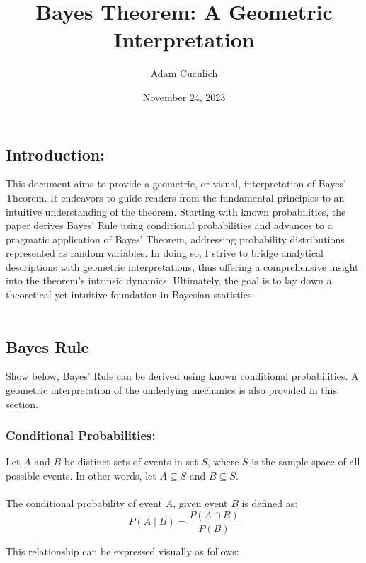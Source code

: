 \documentclass[12pt]{article}
\title{Bayes Theorem: A Geometric Interpretation}
\author{Adam Cuculich}
\date{November 24, 2023}
\begin{document}
\maketitle %

\subsection*{Introduction:}
This document aims to provide a geometric, or visual, interpretation of Bayes’ Theorem. It endeavors to guide readers from the fundamental principles to an intuitive understanding of the theorem. Starting with known probabilities, the paper derives Bayes’ Rule using conditional probabilities and advances to a pragmatic application of Bayes’ Theorem, addressing probability distributions represented as random variables. In doing so, I strive to bridge analytical descriptions with geometric interpretations, thus offering a comprehensive insight into the theorem’s intrinsic dynamics. Ultimately, the goal is to lay down a theoretical yet intuitive foundation in Bayesian statistics. \\\\

\newpage

\subsection*{Bayes Rule}
Show below, Bayes' Rule can be derived using known conditional probabilities. A geometric interpretation of the underlying mechanics is also provided in this section.
\subsubsection*{Conditional Probabilities:}
Let \(A\) and \(B\) be distinct sets of events in set \(S\), where \(S\) is the sample space of all possible events. In other words, let  \( A \subseteq S \) and \( B \subseteq S \). \\\\
The conditional probability of event \( A \), given event \( B \) is defined as:
\begin{equation}
P(A \mid B) = \frac{P(A \cap B)}{P(B)}
\end{equation}

\noindent This relationship can be expressed visually as follows:\\
\end{document}
